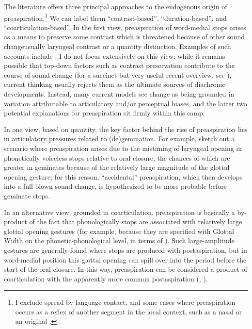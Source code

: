 \documentclass[output=paper,colorlinks,citecolor=brown]{langscibook}
\begin{document}
The literature offers three principal approaches to the endogenous origin of preaspiration.\footnote{I exclude spread by language contact, and some cases where preaspiration occurs as a reflex of another segment in the local context, such as a nasal or an original \ipa{[h]}.} We can label them \enquote{contrast\hyp based}, \enquote{duration\hyp based}, and \enquote{coarticulation\hyp based}. In the first view, preaspiration of word\hyp medial stops arises as a means to preserve some contrast which is threatened because of other sound change\dash usually laryngeal contrast or a quantity distinction. Examples of such accounts include \textcite{nichasaide1986preaspiration, omurchu85, goblirsch2001icelandic}. I do not focus extensively on this view: while it remains possible that top\hyp down factors such as contrast preservation contribute to the course of sound change (for a succinct but very useful recent overview, see \citealt[chap.~9]{salmons2021sound}), current thinking usually rejects them as the ultimate sources of diachronic developments. Instead, many current models see change as being grounded in variation attributable to articulatory and/or perceptual biases, and the latter two potential explanations for preaspiration sit firmly within this camp.

In one view, based on quantity, the key factor behind the rise of preaspiration lies in articulatory pressures related to (de)gemination. For example, \textcite{blevins1993ponapeic} sketch out a scenario where preaspiration arises due to the mistiming of laryngeal opening in phonetically voiceless stops relative to oral closure, the chances of which are greater in geminates because of the relatively large magnitude of the glottal opening gesture; for this reason, \enquote{accidental} preaspiration, which then develops into a full\hyp blown sound change, is hypothesized to be more probable before geminate stops.

In an alternative view, grounded in coarticulation, preaspiration is basically a by\hyp product of the fact that phonologically {\VOICELESS} stops are associated with relatively large glottal opening gestures (for example, because they are specified with Glottal Width on the phonetic\hyp phonological level, in terms of \citealt{avery01:_laryn, Natvig2019}). Such large\hyp amplitude gestures are generally found where {\VOICELESS} stops are produced with postaspiration, but in word\hyp medial position this glottal opening can spill over into the period before the start of the oral closure. In this way, preaspiration can be considered a product of coarticulation with the apparently more common postaspiration (, \citealt{morris2017linguistic}).
\end{document}
